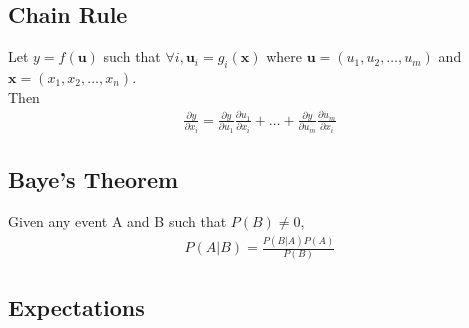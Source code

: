 \documentclass[a4paper,12pt]{article}
\theoremstyle{definition}
\begin{document}
    \subsection*{Chain Rule}
    Let $y = f(\mathbf{u})$ such that $\forall i, \mathbf{u}_i = g_i(\mathbf{x})$ where $\mathbf{u} = (u_1, u_2, \ldots, u_m)$ and $\mathbf{x} = (x_1, x_2, \ldots, x_n)$. \\
    Then
    \begin{equation}
        \begin{aligned}
            \frac{\partial y}{\partial x_i} = \frac{\partial y}{\partial u_1}\frac{\partial u_1}{\partial x_i} + \ldots + \frac{\partial y}{\partial u_m}\frac{\partial u_m}{\partial x_i} 
        \end{aligned}
    \end{equation}

    \subsection*{Baye's Theorem}
    Given any event A and B such that $P(B) \neq 0$, 
    \begin{equation}
        \begin{aligned}
            P(A|B) = \frac{P(B|A)P(A)}{P(B)}
        \end{aligned}
    \end{equation}

    \subsection*{Expectations}
\end{document}
